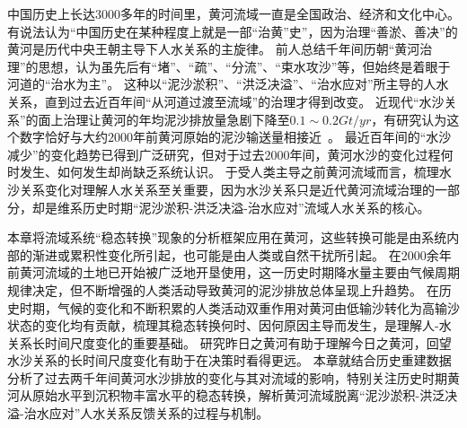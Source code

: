 

中国历史上长达3000多年的时间里，黄河流域一直是全国政治、经济和文化中心。
有说法认为“中国历史在某种程度上就是一部“治黄”史”，因为治理“善淤、善决”的黄河是历代中央王朝主导下人水关系的主旋律。
前人总结千年间历朝“黄河治理”的思想，认为虽先后有“堵”、“疏”、“分流”、“束水攻沙”等，但始终是着眼于河道的“治水为主”\cite{WangWeiJing2009}。
这种以“泥沙淤积”、“洪泛决溢”、“治水应对”所主导的人水关系，直到过去近百年间“从河道过渡至流域”的治理才得到改变。
近现代“水沙关系”的面上治理让黄河的年均泥沙排放量急剧下降至$0.1\sim0.2 Gt/yr$，有研究认为这个数字恰好与大约$2000$年前黄河原始的泥沙输送量相接近~\cite{wang2007}。
最近百年间的“水沙减少”的变化趋势已得到广泛研究\cite{wei2016, song2020, wang2016a}，但对于过去$2000$年间，黄河水沙的变化过程何时发生、如何发生却尚缺乏系统认识。
于受人类主导之前黄河流域而言，梳理水沙关系变化对理解人水关系至关重要，因为水沙关系只是近代黄河流域治理的一部分，却是维系历史时期“泥沙淤积-洪泛决溢-治水应对”流域人水关系的核心。


本章将流域系统“稳态转换”现象的分析框架应用在黄河，这些转换可能是由系统内部的渐进或累积性变化所引起，也可能是由人类或自然干扰所引起。
在$2000$余年前黄河流域的土地已开始被广泛地开垦使用，这一历史时期降水量主要由气候周期规律决定，但不断增强的人类活动导致黄河的泥沙排放总体呈现上升趋势\cite{wang2007}。
在历史时期，气候的变化和不断积累的人类活动双重作用对黄河由低输沙转化为高输沙状态的变化均有贡献，梳理其稳态转换何时、因何原因主导而发生，是理解人-水关系长时间尺度变化的重要基础。
研究昨日之黄河有助于理解今日之黄河，回望水沙关系的长时间尺度变化有助于在决策时看得更远。
本章就结合历史重建数据分析了过去两千年间黄河水沙排放的变化与其对流域的影响，特别关注历史时期黄河从原始水平到沉积物丰富水平的稳态转换，解析黄河流域脱离“泥沙淤积-洪泛决溢-治水应对”人水关系反馈关系的过程与机制。

